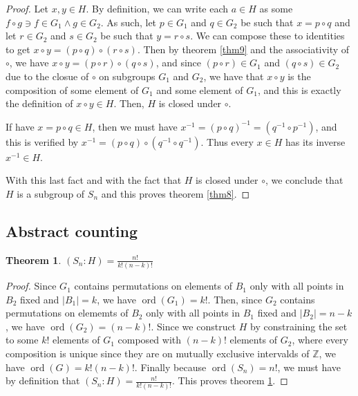 \documentclass[12pt]{article}
\newcommand{\ints}{\mathbb{Z}}
\newcommand{\ord}{\operatorname{ord}}
\newtheorem{thm}{Theorem}
\begin{document}
\begin{proof}
	Let $x,y \in H$.
	By definition,
	we can write each $a \in H$
	as some $f \circ g \ni f \in G_1 \land g \in G_2$.
	As such, let $p \in G_1$ and $q \in G_2$ be
	such that $x = p \circ q$
	and let $r \in G_2$ and $s \in G_2$ be
	such that $y = r \circ s$.
	We can compose these to identities
	to get $x \circ y = (p \circ q) \circ (r \circ s)$.
	Then by theorem \ref{thm9} and the associativity of $\circ$,
	we have $x \circ y = (p \circ r) \circ (q \circ s)$,
	and since $(p \circ r) \in G_1$ and $(q \circ s) \in G_2$
	due to the closue of $\circ$ on subgroups $G_1$ and $G_2$,
	we have that $x \circ y$ is the composition of
	some element of $G_1$ and some element of $G_1$,
	and this is exactly the definition of $x \circ y \in H$.
	Then, $H$ is closed under $\circ$.

	If have $x = p \circ q \in H$,
	then we must have $x^{-1} = (p \circ q)^{-1} = (q^{-1} \circ p^{-1})$,
	and this is verified by $x^{-1} = (p \circ q) \circ (q^{-1} \circ q^{-1})$.
	Thus every $x \in H$ has its inverse $x^{-1} \in H$.

	With this last fact
	and with the fact that
	$H$ is closed under $\circ$,
	we conclude that
	$H$ is a subgroup of $S_n$
	and this proves theorem \ref{thm8}.
\end{proof}

\subsection{Abstract counting}

\begin{thm} \label{thm10}
	$(S_n:H) = \frac{n!}{k!(n-k)!}$
\end{thm}

\begin{proof}
	Since $G_1$ contains permutations
	on elements of $B_1$ only with all
	points in $B_2$ fixed and $|B_1| = k$,
	we have $\ord(G_1) = k!$.
	Then, since $G_2$ contains permutations
	on elememts of $B_2$ only with all
	points in $B_1$ fixed and $|B_2| = n - k$,
	we have $\ord(G_2) = (n - k)!$.
	Since we construct $H$
	by constraining the set to 
	some $k!$ elements of $G_1$
	composed with $(n-k)!$
	elements of $G_2$,
	where every composition is unique
	since they are on mutually
	exclusive intervalds of $\ints$,
	we have $\ord(G) = k!(n-k)!$.
	Finally because $\ord(S_n) = n!$,
	we must have by definition
	that $(S_n:H) = \frac{n!}{k!(n-k)!}$.
	This proves theorem \ref{thm10}.
\end{proof}
\end{document}
